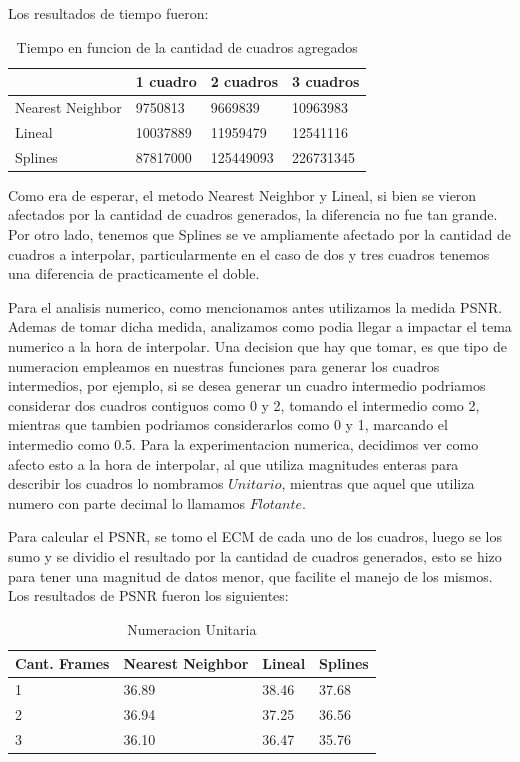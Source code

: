 Los resultados de tiempo fueron:

\begin{table}[h]
\centering
\caption{Tiempo en funcion de la cantidad de cuadros agregados}
\label{my-label}
\begin{tabular}{llll}
\hline
                 & 1 cuadro   & 2 cuadros   & 3 cuadros   \\ \hline
Nearest Neighbor & 9750813  & 9669839   & 10963983  \\
Lineal           & 10037889 & 11959479  & 12541116  \\
Splines          & 87817000 & 125449093 & 226731345 \\ \hline
\end{tabular}
\end{table}

Como era de esperar, el metodo Nearest Neighbor y Lineal, si bien se vieron afectados por la cantidad de cuadros generados, la diferencia no fue tan grande. Por otro lado, tenemos que Splines se ve ampliamente afectado por la cantidad de cuadros a interpolar, particularmente en el caso de dos y tres cuadros tenemos una diferencia de practicamente el doble.

Para el analisis numerico, como mencionamos antes utilizamos la medida PSNR. Ademas de tomar dicha medida, analizamos como podia llegar a impactar el tema numerico a la hora de interpolar. Una decision que hay que tomar, es que tipo de numeracion empleamos en nuestras funciones para generar los cuadros intermedios, por ejemplo, si se desea generar un cuadro intermedio podriamos considerar dos cuadros contiguos como 0 y 2, tomando el intermedio como 2, mientras que tambien podriamos considerarlos como 0 y 1, marcando el intermedio como 0.5. Para la experimentacion numerica, decidimos ver como afecto esto a la hora de interpolar, al que utiliza magnitudes enteras para describir los cuadros lo nombramos $Unitario$, mientras que aquel que utiliza numero con parte decimal lo llamamos $Flotante$.

Para calcular el PSNR, se tomo el ECM de cada uno de los cuadros, luego se los sumo y se dividio el resultado por la cantidad de cuadros generados, esto se hizo para tener una magnitud de datos menor, que facilite el manejo de los mismos. Los resultados de PSNR fueron los siguientes:

\begin{table}[h]
\centering
\caption{Numeracion Unitaria}
\label{my-label}
\begin{tabular}{llll}
\hline
Cant. Frames & Nearest Neighbor & Lineal & Splines \\ \hline
1            & 36.89            & 38.46  & 37.68   \\
2            & 36.94            & 37.25  & 36.56   \\
3            & 36.10            & 36.47  & 35.76   \\ \hline
\end{tabular}
\end{table}

